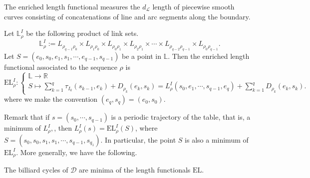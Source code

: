 \documentclass[reqno,11pt]{amsart}
\begin{document}
The enriched length functional measures the \(d_\mathcal{L}\) length of piecewise smooth curves consisting of concatenations of line and arc segments along the boundary.
\begin{defi}
Let \( \mathbb{L}^I_\rho\) be the following product of link sets.
\[
   \mathbb{L}^I_\rho := L_{\rho_{q-1}\rho_{0}} \times L_{\rho_1\rho_0} \times L_{\rho_0\rho_1} \times L_{\rho_2\rho_1} \times \cdots \times L_{\rho_{q-2}\rho_{q-1}} \times L_{\rho_0\rho_{q-1}}.
\]
Let \( S =  (e_{0}, s_0, e_1, s_1, \cdots, e_{q-1}, s_{q-1}) \) be a point in \( \mathbb{L} \).
Then the enriched length functional associated to the sequence \( \rho \) is
\[
	\mathrm{EL}^{I}_\rho \colon \left\{
        \begin{array}{lcl} 
            \mathbb{L} \to \mathbb{R} \\
	       S \mapsto      {\displaystyle{\sum_{k=1}^{q}}} \tau_{I_k}(s_{k - 1},e_{k}) + D_{\rho_k}(e_{k}, s_{k}) 
            =
            L^I_\rho(s_0, e_1, \cdots, s_{q-1}, e_q) + {\displaystyle{\sum_{k=1}^{q}}} D_{\rho_k}(e_{k}, s_{k}).
        \end{array}
        \right.
\]
where we make the convention \( (e_q, s_q) = (e_0, s_0). \)
\end{defi}
Remark that if \(s =  (s_0, \cdots, s_{q-1}) \) is a periodic trajectory of the table, that is, a minimum of \( L^I_\rho, \),  then \(L^I_\rho(s) = \mathrm{EL}^I_\rho(S) \), where \(S =  (s_0, s_0, s_1, s_1, \cdots, s_{q-1}, s_{q_1}) \).
In particular, the point \(S\) is also a minimum of \( \mathrm{EL}^I_\rho \).
More generally, we have the following.
\begin{prop}
    The billiard cycles of \( \mathcal{D} \) are minima of the length functionals \( \mathrm{EL} \).
\end{prop}
\end{document}
